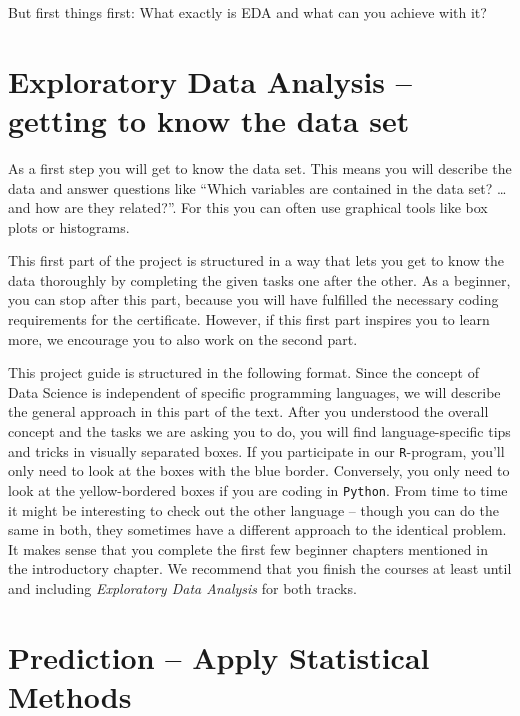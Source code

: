 \documentclass[
  11pt,
]{book}
\begin{document}
But first things first: What exactly is EDA and what can you achieve with it?

\hypertarget{exploratory-data-analysis-getting-to-know-the-data-set}{%
\section{Exploratory Data Analysis -- getting to know the data set}\label{exploratory-data-analysis-getting-to-know-the-data-set}}

As a first step you will get to know the data set. This means you will describe the data and answer questions like ``Which variables are contained in the data set? \ldots and how are they related?''. For this you can often use graphical tools like box plots or histograms.

This first part of the project is structured in a way that lets you get to know the data thoroughly by completing the given tasks one after the other. As a beginner, you can stop after this part, because you will have fulfilled the necessary coding requirements for the certificate. However, if this first part inspires you to learn more, we encourage you to also work on the second part.

This project guide is structured in the following format. Since the concept of Data Science is independent of specific programming languages, we will describe the general approach in this part of the text. After you understood the overall concept and the tasks we are asking you to do, you will find language-specific tips and tricks in visually separated boxes. If you participate in our \texttt{R}-program, you'll only need to look at the boxes with the blue border. Conversely, you only need to look at the yellow-bordered boxes if you are coding in \texttt{Python}. From time to time it might be interesting to check out the other language -- though you can do the same in both, they sometimes have a different approach to the identical problem. It makes sense that you complete the first few beginner chapters mentioned in the introductory chapter. We recommend that you finish the courses at least until and including \emph{Exploratory Data Analysis} for both tracks.

\hypertarget{prediction-apply-statistical-methods}{%
\section{Prediction -- Apply Statistical Methods}\label{prediction-apply-statistical-methods}}
\end{document}
